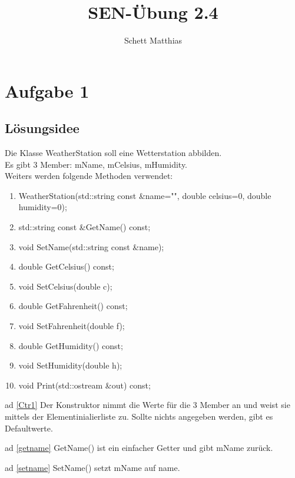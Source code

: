 \documentclass[10pt,a4paper, parskip=half]{scrartcl}
\author{Schett Matthias}
\title{SEN-Übung 2.4}
\begin{document}
\maketitle

\section{Aufgabe 1}

\subsection{L\"{o}sungsidee}

Die Klasse WeatherStation soll eine Wetterstation abbilden.
\\Es gibt 3 Member: mName, mCelsius, mHumidity.
\\Weiters werden folgende Methoden verwendet:

\begin{enumerate}
	\item WeatherStation(std::string const \&name="", double celsius=0, double humidity=0);\label{Ctr1}
    \item std::string const \&GetName() const;\label{getname}
    \item void SetName(std::string const \&name);\label{setname}
    \item double GetCelsius() const;\label{getcels}
    \item void SetCelsius(double c);\label{setcels}
    \item double GetFahrenheit() const;\label{getfahren}
    \item void SetFahrenheit(double f);\label{setfahren}
    \item double GetHumidity() const;\label{gethum}
    \item void SetHumidity(double h);\label{sethum}
	\item void Print(std::ostream \&out) const;\label{print}
\end{enumerate}

ad \ref{Ctr1}
Der Konstruktor nimmt die Werte für die 3 Member an und weist sie mittels der Elementinialierliste zu.
Sollte nichts angegeben werden, gibt es Defaultwerte.

ad \ref{getname}
GetName() ist ein einfacher Getter und gibt mName zurück.

ad \ref{setname}
SetName() setzt mName auf name.
\end{document}
